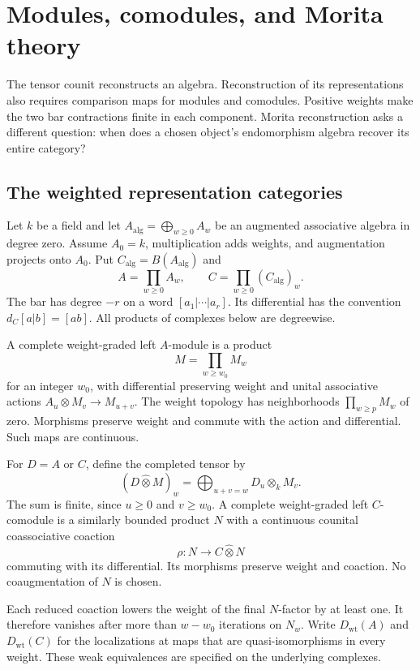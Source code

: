 \chapter{Modules, comodules, and Morita theory}
The tensor counit reconstructs an algebra.
Reconstruction of its representations also requires comparison maps for modules and comodules.
Positive weights make the two bar contractions finite in each component.
Morita reconstruction asks a different question: when does a chosen object's endomorphism algebra recover its entire category?

\section{The weighted representation categories}
Let $k$ be a field and let $A_{\mathrm{alg}}=\bigoplus_{w\geq0}A_w$ be an augmented associative algebra in degree zero.
Assume $A_0=k$, multiplication adds weights, and augmentation projects onto $A_0$.
Put $C_{\mathrm{alg}}=B(A_{\mathrm{alg}})$ and
\[
 A=\prod_{w\geq0}A_w,\qquad
 C=\prod_{w\geq0}(C_{\mathrm{alg}})_w.
\]
The bar has degree $-r$ on a word $[a_1|\cdots|a_r]$.
Its differential has the convention $d_C[a|b]=[ab]$.
All products of complexes below are degreewise.

A complete weight-graded left $A$-module is a product
\[
 M=\prod_{w\geq w_0}M_w
\]
for an integer $w_0$, with differential preserving weight and unital associative actions
$A_u\otimes M_v\to M_{u+v}$.
The weight topology has neighborhoods $\prod_{w\geq p}M_w$ of zero.
Morphisms preserve weight and commute with the action and differential.
Such maps are continuous.

For $D=A$ or $C$, define the completed tensor by
\[
 (D\widehat\otimes M)_w=\bigoplus_{u+v=w}D_u\otimes_k M_v.
\]
The sum is finite, since $u\geq0$ and $v\geq w_0$.
A complete weight-graded left $C$-comodule is a similarly bounded product $N$ with a continuous counital coassociative coaction
\[
 \rho:N\longrightarrow C\widehat\otimes N
\]
commuting with its differential.
Its morphisms preserve weight and coaction.
No coaugmentation of $N$ is chosen.

Each reduced coaction lowers the weight of the final $N$-factor by at least one.
It therefore vanishes after more than $w-w_0$ iterations on $N_w$.
Write $D_{\mathrm{wt}}(A)$ and $D_{\mathrm{wt}}(C)$ for the localizations at maps that are quasi-isomorphisms in every weight.
These weak equivalences are specified on the underlying complexes.

